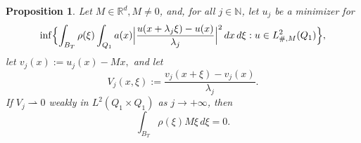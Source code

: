 \documentclass{article}
\newtheorem{proposition}[lemma]{Proposition}
\theoremstyle{definition}
\newcommand{\N}{\mathbb{N}}
\newcommand{\R}{\mathbb{R}}
\begin{document}
\begin{proposition}\label{prop : superobstruction}
Let $M\in \R^{d}, M\neq 0$, and, for all $j\in\N$, let $u_j$ be a minimizer for    
\begin{equation}\label{superminima}
    \inf\Bigl\{ \int_{B_T} \rho(\xi)\int_{Q_1} a(x)\Bigl|\frac{u(x+\lambda_j\xi)-u(x)}{\lambda_j}\Bigr|^2\, dx\,d\xi : u\in L^2_{\#,M}(Q_1) \Bigr\},
\end{equation}
let $v_j(x):=u_j(x)-Mx,$ and let 
\begin{equation*}
    V_j(x,\xi):=\frac{v_j(x+\xi)-v_j(x)}{\lambda_j}.
\end{equation*}
If $V_j\rightharpoonup 0$ weakly in $L^2(Q_1\times Q_1)$ as $j\to+\infty$, then 
\begin{equation*}
    \int_{B_T}\rho(\xi)M\xi\,d\xi=0.
\end{equation*}
\end{proposition}
\end{document}
